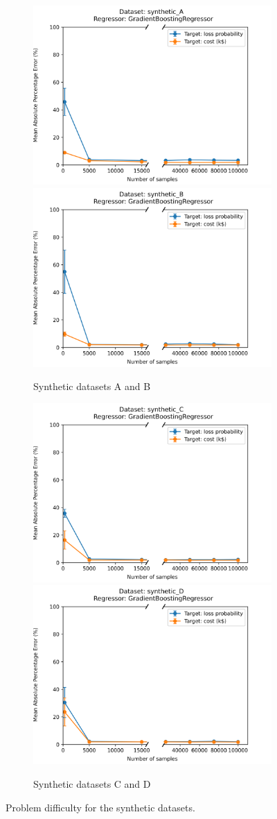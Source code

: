 \begin{figure}[h!]
  \begin{subfigure}{\linewidth}
  \includegraphics[width=.5\linewidth]{images/synthetic/synthetic_A_complexity.png}\hfill
  \includegraphics[width=.5\linewidth]{images/synthetic/synthetic_B_complexity.png}
  \caption{Synthetic datasets A and B}
  \end{subfigure}\par\medskip
  \begin{subfigure}{\linewidth}
  \includegraphics[width=.5\linewidth]{images/synthetic/synthetic_C_complexity.png}\hfill
  \includegraphics[width=.5\linewidth]{images/synthetic/synthetic_D_complexity.png}
  \caption{Synthetic datasets C and D}
  \end{subfigure}
  \caption{\label{fig:synthetic_data_complexity}Problem difficulty for the synthetic datasets.}
\end{figure}

